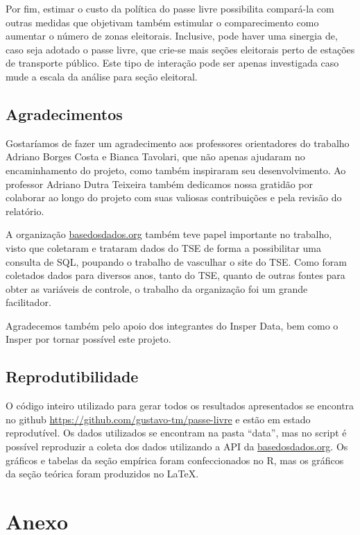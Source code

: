 Por fim, estimar o custo da política do passe livre possibilita compará-la com outras medidas que objetivam também estimular o comparecimento como aumentar o número de zonas eleitorais. Inclusive, pode haver uma sinergia de, caso seja adotado o passe livre, que crie-se mais seções eleitorais perto de estações de transporte público. Este tipo de interação pode ser apenas investigada caso mude a escala da análise para seção eleitoral. 

\subsection{Agradecimentos}

Gostaríamos de fazer um agradecimento aos professores orientadores do trabalho Adriano Borges Costa e Bianca Tavolari, que não apenas ajudaram no encaminhamento do projeto, como também inspiraram seu desenvolvimento. Ao professor Adriano Dutra Teixeira também dedicamos nossa gratidão por colaborar ao longo do projeto com suas valiosas contribuições e pela revisão do relatório.

A organização \url{basedosdados.org} também teve papel importante no trabalho, visto que coletaram e trataram dados do TSE de forma a possibilitar uma consulta de SQL, poupando o trabalho de vasculhar o site do TSE. Como foram coletados dados para diversos anos, tanto do TSE, quanto de outras fontes para obter as variáveis de controle, o trabalho da organização foi um grande facilitador. 

Agradecemos também pelo apoio dos integrantes do Insper Data, bem como o Insper por tornar possível este projeto.

\subsection{Reprodutibilidade}

O código inteiro utilizado para gerar todos os resultados apresentados se encontra no github \url{https://github.com/gustavo-tm/passe-livre} e estão em estado reprodutível. Os dados utilizados se encontram na pasta ``data'', mas no script é possível reproduzir a coleta dos dados utilizando a API da \url{basedosdados.org}. Os gráficos e tabelas da seção empírica foram confeccionados no R, mas os gráficos da seção teórica foram produzidos no \LaTeX . 


\clearpage
\section{Anexo}
\label{sec_anex}



